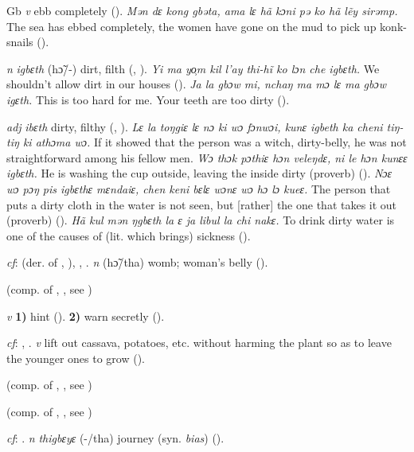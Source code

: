 \begin{letter}{Gb}
 \textit{v} ebb completely (\citealt{Pichl1967}). \textit{Mən dɛ kong gbəta, ama lɛ hã kɔni pə ko hã lẽy sirəmp.} The sea has ebbed completely, the women have gone on the mud to pick up konk-snails (\citealt{Pichl1967}). 

 \textit{n} \textit{igbɛth} (hɔ̃/-) dirt, filth (\citealt{Pichl1967}, \citealt{Sumner1921}). \textit{Yi ma yo̹m kil l'ay thi-hĩ ko lɔn che igbɛth.} We shouldn't allow dirt in our houses (\citealt{Pichl1967}). \textit{Ja la gbɔw mi, nchaŋ ma mɔ lɛ ma gbɔw igɛth.} This is too hard for me. Your teeth are too dirty (\citealt{Pichl1967}).

 \textit{adj} \textit{ibɛth} dirty, filthy (\citealt{Pichl1967}, \citealt{Sumner1921}). \textit{Lɛ la toŋgiɛ lɛ nɔ ki wɔ fɔnwɔi, kunɛ igbeth ka cheni tiŋ-tiŋ ki athɔma wɔ.} If it showed that the person was a witch, dirty-belly, he was not straightforward among his fellow men. \textit{Wɔ thɔk pɔthiɛ hɔn veleŋdɛ, ni le hɔn kunɛɛ igbɛth.} He is washing the cup outside, leaving the inside dirty (proverb) (\citealt{TISLL1979}). \textit{Nɔɛ wɔ pɔŋ pis igbɛthɛ mɛndaiɛ, chen keni bɛlɛ wɔnɛ wɔ hɔ lɔ kueɛ.} The person that puts a dirty cloth in the water is not seen, but [rather] the one that takes it out (proverb) (\citealt{TISLL1979}). \textit{Hã kul mən ŋgbɛth la ɛ ja libul la chi nakɛ.} To drink dirty water is one of the causes of (lit. which brings) sickness (\citealt{Pichl1967}). 

 \textit{cf}:  (der. of , ), , . \textit{n} (hɔ̃/tha) womb; woman's belly (\citealt{Pichl1967}). 

 (comp. of , , see ) 

 \textit{v} \textbf{1)} hint (\citealt{Pichl1967}). \textbf{2)} warn secretly (\citealt{Pichl1967}).

 \textit{cf}: , . \textit{v} lift out cassava, potatoes, etc. without harming the plant so as to leave the younger ones to grow (\citealt{Pichl1967}). 

 (comp. of , , see ) 

 (comp. of , , see ) 

 \textit{cf}: . \textit{n} \textit{thigbɛyɛ} (-/tha) journey (syn. \textit{bias}) (\citealt{Pichl1967}). 


\end{letter}
